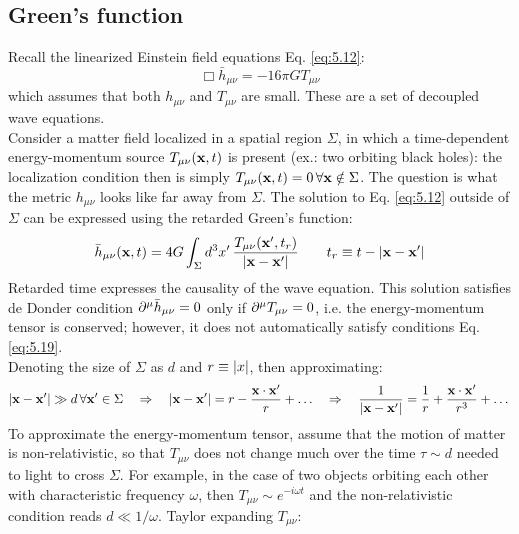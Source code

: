 \subsection{Green's function}

Recall the linearized Einstein field equations Eq. \ref{eq:5.12}:
\begin{equation*}
  \Box \bar{h}_{\mu \nu} = -16\pi G T_{\mu \nu}
\end{equation*}
which assumes that both $ h_{\mu \nu} $ and $ T_{\mu \nu} $ are small. These are a set of decoupled wave equations.\\
Consider a matter field localized in a spatial region $ \Sigma $, in which a time-dependent energy-momentum source $ T_{\mu \nu}(\mathbf{x},t) $ is present (ex.: two orbiting black holes): the localization condition then is simply $ T_{\mu \nu}(\mathbf{x},t) = 0 \,\forall \mathbf{x} \notin \Sigma $. The question is what the metric $ h_{\mu \nu} $ looks like far away from $ \Sigma $. The solution to Eq. \ref{eq:5.12} outside of $ \Sigma $ can be expressed using the retarded Green's function:
\begin{equation}
  \bar{h}_{\mu \nu}(\mathbf{x},t) = 4G \int_\Sigma d^3 x'\, \frac{T_{\mu \nu}(\mathbf{x}',t_r)}{\left\lvert\mathbf{x} - \mathbf{x}'\right\rvert}
  \qquad t_r \equiv t - \left\lvert\mathbf{x} - \mathbf{x}'\right\rvert
  \label{eq:5.25}
\end{equation}
Retarded time expresses the causality of the wave equation. This solution satisfies de Donder condition $ \partial^\mu \bar{h}_{\mu \nu} = 0 $ only if $ \partial^\mu T_{\mu \nu} = 0 $, i.e. the energy-momentum tensor is conserved; however, it does not automatically satisfy conditions Eq. \ref{eq:5.19}.\\
Denoting the size of $ \Sigma $ as $ d $ and $ r \equiv \left\lvert x\right\rvert $, then approximating:
\begin{equation*}
  \left\lvert\mathbf{x} - \mathbf{x}'\right\rvert \gg d \,\forall \mathbf{x}' \in \Sigma
  \quad \Rightarrow \quad
  \left\lvert\mathbf{x} - \mathbf{x}'\right\rvert = r - \frac{\mathbf{x} \cdot \mathbf{x}'}{r} + \dots
  \quad \Rightarrow \quad
  \frac{1}{\left\lvert\mathbf{x} - \mathbf{x}'\right\rvert} = \frac{1}{r} + \frac{\mathbf{x} \cdot \mathbf{x}'}{r^3} + \dots
\end{equation*}
To approximate the energy-momentum tensor, assume that the motion of matter is non-relativistic, so that $ T_{\mu \nu} $ does not change much over the time $ \tau \sim d $ needed to light to cross $ \Sigma $. For example, in the case of two objects orbiting each other with characteristic frequency $ \omega $, then $ T_{\mu \nu} \sim e^{-i \omega t} $ and the non-relativistic condition reads $ d \ll 1/\omega $. Taylor expanding $ T_{\mu \nu} $:
